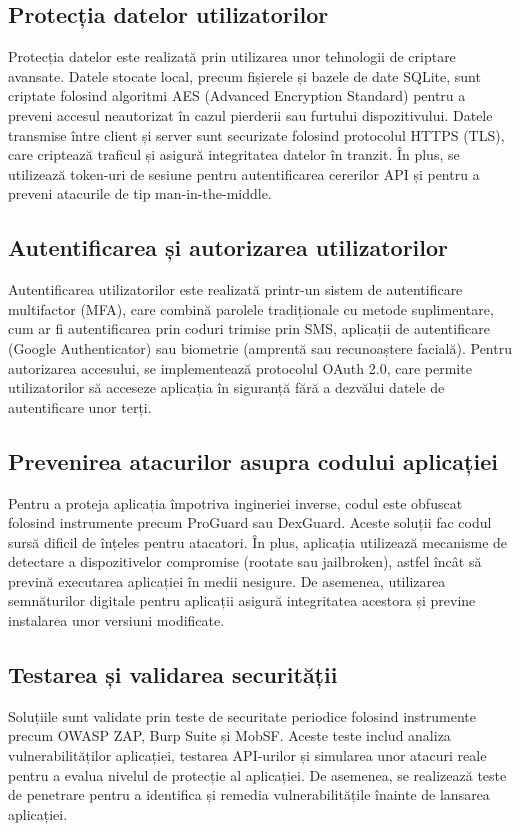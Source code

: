 \documentclass[runningheads]{llncs}
\begin{document}
\subsection{Protecția datelor utilizatorilor}
Protecția datelor este realizată prin utilizarea unor tehnologii de criptare avansate. Datele stocate local, precum fișierele și bazele de date SQLite, sunt criptate folosind algoritmi AES (Advanced Encryption Standard) pentru a preveni accesul neautorizat în cazul pierderii sau furtului dispozitivului. Datele transmise între client și server sunt securizate folosind protocolul HTTPS (TLS), care criptează traficul și asigură integritatea datelor în tranzit. În plus, se utilizează token-uri de sesiune pentru autentificarea cererilor API și pentru a preveni atacurile de tip man-in-the-middle.

\subsection{Autentificarea și autorizarea utilizatorilor}
Autentificarea utilizatorilor este realizată printr-un sistem de autentificare multifactor (MFA), care combină parolele tradiționale cu metode suplimentare, cum ar fi autentificarea prin coduri trimise prin SMS, aplicații de autentificare (Google Authenticator) sau biometrie (amprentă sau recunoaștere facială). Pentru autorizarea accesului, se implementează protocolul OAuth 2.0, care permite utilizatorilor să acceseze aplicația în siguranță fără a dezvălui datele de autentificare unor terți.

\subsection{Prevenirea atacurilor asupra codului aplicației}
Pentru a proteja aplicația împotriva ingineriei inverse, codul este obfuscat folosind instrumente precum ProGuard sau DexGuard. Aceste soluții fac codul sursă dificil de înțeles pentru atacatori. În plus, aplicația utilizează mecanisme de detectare a dispozitivelor compromise (rootate sau jailbroken), astfel încât să prevină executarea aplicației în medii nesigure. De asemenea, utilizarea semnăturilor digitale pentru aplicații asigură integritatea acestora și previne instalarea unor versiuni modificate.

\subsection{Testarea și validarea securității}
Soluțiile sunt validate prin teste de securitate periodice folosind instrumente precum OWASP ZAP, Burp Suite și MobSF. Aceste teste includ analiza vulnerabilităților aplicației, testarea API-urilor și simularea unor atacuri reale pentru a evalua nivelul de protecție al aplicației. De asemenea, se realizează teste de penetrare pentru a identifica și remedia vulnerabilitățile înainte de lansarea aplicației.
\end{document}
